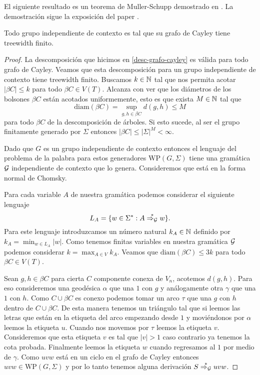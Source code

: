 \documentclass[tesis.tex]{subfiles}
\newcommand{\WP}{\text{WP}(G, \Sigma)}
\newcommand{\deriva}{\overset{*}{\Rightarrow_{\cal G}}}
\begin{document}
El siguiente resultado es un teorema de Muller-Schupp demostrado en \cite{muller1985theory}.
La demostración sigue la exposición del paper \cite{diekert_contextfree_2017}.
\medskip
\begin{teo}  \label{teo_schupp_muller_ic_desc}
	Todo grupo independiente de contexto es tal que su grafo de Cayley tiene treewidth finito.
\end{teo}
\begin{proof}

La descomposición que hicimos en \ref{desc-grafo-cayley} es válida para todo grafo de Cayley. 
Veamos que esta descomposición para un grupo independiente de contexto tiene treewidth finito. 
Buscamos $k \in \mathbb N$ tal que nos permita acotar $|\beta C| \le k$ para todo $\beta C \in V(T)$. 
Alcanza con ver que los diámetros de los bolsones $\beta C$ están acotados uniformemente, esto es que exista $M \in \mathbb N$ tal que 
\[
\text{diam}(\beta C) =  \sup_{g,h \in \beta C} d(g,h) \le M
\] 
para todo $\beta C$ de la descomposición de árboles.
Si esto sucede, al ser el grupo finitamente generado por $\Sigma$ entonces $|\beta C| \le |\Sigma|^{M} < \infty$.


Dado que $G$ es un grupo independiente de contexto entonces el lenguaje del problema de la palabra para estos generadores $\WP$ tiene una gramática $\cal G$ independiente de contexto que lo genera. 
Consideremos que está en la forma normal de Chomsky.

Para cada variable $A$ de nuestra gramática podemos considerar el siguiente lenguaje
\[
L_A = \{ w \in \Sigma^* : A \deriva w  \}.
\]
Para este lenguaje introduzcamos un número natural $k_A \in \mathbb N$ definido por $k_A = \min_{w \in L_A} |w|$. 
Como tenemos finitas variables en nuestra gramática $\cal G$ podemos considerar $k = \max_{A \in V} k_A$. 
Veamos que $\text{diam}(\beta C) \le 3k$ para todo $\beta C \in V(T)$.

Sean $g,h \in \beta C$ para cierta $C$ componente conexa de $V_n$, acotemos $d(g,h)$. 
Para eso consideremos una geodésica $\alpha$ que una $1$ con $g$ y análogamente otra $\gamma$ que una $1$ con $h$. 
Como $C \cup \beta C$ es conexo podemos tomar un arco $\tau$ que una $g$ con  $h$ dentro de $C \cup \beta C$. 
De esta manera tenemos un triángulo tal que si leemos las letras que están en la etiqueta del arco empezando desde $1$ y moviéndonos por $\alpha$ leemos la etiqueta $u$. 
Cuando nos movemos por $\tau$ leemos la etiqueta $v$. Consideremos que esta etiqueta $v$ es tal que $|v|>1$ caso contrario ya tenemos la cota probada. Finalmente leemos la etiqueta $w$ cuando regresamos al $1$ por medio de $\gamma$.
Como $uvw$ está en un ciclo en el grafo de Cayley entonces $uvw \in  \WP$ y por lo tanto tenemos alguna derivación $S \deriva uvw$.


\end{proof}
\end{document}
